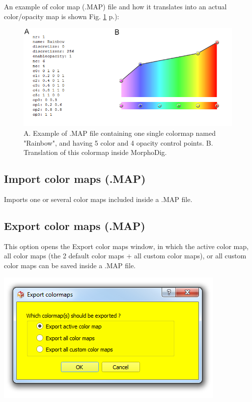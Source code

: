 An example of color map (.MAP) file and how it translates into an actual color/opacity map is shown Fig. \ref{color_map_example} p.\pageref{color_map_example}):\\

\begin{figure}
  \centering
  \includegraphics[scale=0.5]{images/07/colormaps/example.png}
 \caption{A. Example of .MAP file containing one single colormap named "Rainbow", and having 5 color and 4 opacity control points. B. Translation of this colormap inside MorphoDig.}
\label{color_map_example}
\end{figure}


\subsection{Import color maps (.MAP)}
Imports one or several color maps included inside a .MAP file. 

\subsection{Export color maps (.MAP)}

\begin{minipage}{0.55\textwidth}
This option opens the Export color maps window, in which the active color map, all color maps (the 2 default color maps + all custom color maps), or all custom color maps can be saved inside a .MAP file.


\end{minipage}  
 \begin{minipage}{0.45\textwidth}\centering
  \includegraphics[scale=0.5]{images/07/colormaps/export.png}
 \end{minipage} 


